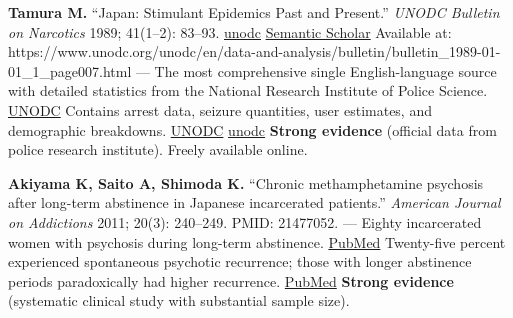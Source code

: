 \textbf{Tamura M.} ``Japan: Stimulant Epidemics Past and Present.'' \emph{UNODC Bulletin on Narcotics} 1989; 41(1--2): 83--93. \href{https://www.unodc.org/unodc/en/data-and-analysis/bulletin/bulletin_1989-01-01_1_page007.html}{unodc} \href{https://www.semanticscholar.org/paper/The-forgotten-success-story:-Japan-and-the-problem-Edstr\%C3\%B6m/59c1dec41766481719ddc07bcc096c950ff9399d}{Semantic Scholar} Available at: https://www.unodc.org/unodc/en/data-and-analysis/bulletin/bulletin\_1989-01-01\_1\_page007.html --- The most comprehensive single English-language source with detailed statistics from the National Research Institute of Police Science. \href{https://www.unodc.org/unodc/en/data-and-analysis/bulletin/bulletin_1989-01-01_1_page007.html}{UNODC} Contains arrest data, seizure quantities, user estimates, and demographic breakdowns. \href{https://www.unodc.org/unodc/en/data-and-analysis/bulletin/bulletin_1989-01-01_1_page007.html}{UNODC} \href{https://www.unodc.org/unodc/en/data-and-analysis/bulletin/bulletin_1989-01-01_1_page007.html}{unodc} \textbf{Strong evidence} (official data from police research institute). Freely available online.

\textbf{Akiyama K, Saito A, Shimoda K.} ``Chronic methamphetamine psychosis after long-term abstinence in Japanese incarcerated patients.'' \emph{American Journal on Addictions} 2011; 20(3): 240--249. PMID: 21477052. --- Eighty incarcerated women with psychosis during long-term abstinence. \href{https://pubmed.ncbi.nlm.nih.gov/21477052/}{PubMed} Twenty-five percent experienced spontaneous psychotic recurrence; those with longer abstinence periods paradoxically had higher recurrence. \href{https://pubmed.ncbi.nlm.nih.gov/21477052/}{PubMed} \textbf{Strong evidence} (systematic clinical study with substantial sample size).

